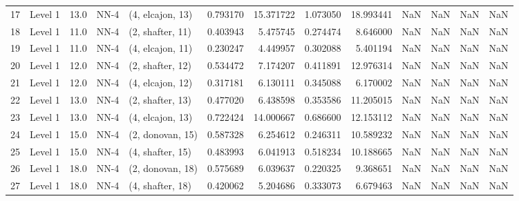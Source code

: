 \begin{tabular}{llrllrrrrrrrr}
17 &   Level 1 &   13.0 &        NN-4 &  (4, elcajon, 13) &   0.793170 &  15.371722 &  1.073050 &  18.993441 &                  NaN &                    NaN &                 NaN &                   NaN \\
18 &   Level 1 &   11.0 &        NN-4 &  (2, shafter, 11) &   0.403943 &   5.475745 &  0.274474 &   8.646000 &                  NaN &                    NaN &                 NaN &                   NaN \\
19 &   Level 1 &   11.0 &        NN-4 &  (4, elcajon, 11) &   0.230247 &   4.449957 &  0.302088 &   5.401194 &                  NaN &                    NaN &                 NaN &                   NaN \\
20 &   Level 1 &   12.0 &        NN-4 &  (2, shafter, 12) &   0.534472 &   7.174207 &  0.411891 &  12.976314 &                  NaN &                    NaN &                 NaN &                   NaN \\
21 &   Level 1 &   12.0 &        NN-4 &  (4, elcajon, 12) &   0.317181 &   6.130111 &  0.345088 &   6.170002 &                  NaN &                    NaN &                 NaN &                   NaN \\
22 &   Level 1 &   13.0 &        NN-4 &  (2, shafter, 13) &   0.477020 &   6.438598 &  0.353586 &  11.205015 &                  NaN &                    NaN &                 NaN &                   NaN \\
23 &   Level 1 &   13.0 &        NN-4 &  (4, elcajon, 13) &   0.722424 &  14.000667 &  0.686600 &  12.153112 &                  NaN &                    NaN &                 NaN &                   NaN \\
24 &   Level 1 &   15.0 &        NN-4 &  (2, donovan, 15) &   0.587328 &   6.254612 &  0.246311 &  10.589232 &                  NaN &                    NaN &                 NaN &                   NaN \\
25 &   Level 1 &   15.0 &        NN-4 &  (4, shafter, 15) &   0.483993 &   6.041913 &  0.518234 &  10.188665 &                  NaN &                    NaN &                 NaN &                   NaN \\
26 &   Level 1 &   18.0 &        NN-4 &  (2, donovan, 18) &   0.575689 &   6.039637 &  0.220325 &   9.368651 &                  NaN &                    NaN &                 NaN &                   NaN \\
27 &   Level 1 &   18.0 &        NN-4 &  (4, shafter, 18) &   0.420062 &   5.204686 &  0.333073 &   6.679463 &                  NaN &                    NaN &                 NaN &                   NaN \\

\end{tabular}
